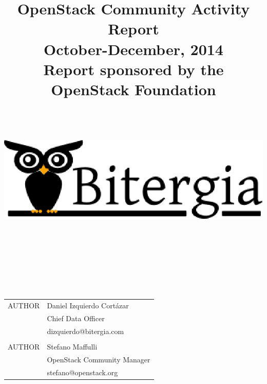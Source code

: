 \documentclass[a4wide,11pt]{report}
\begin{document}
\title{OpenStack Community Activity Report\\
      October-December, 2014 \\
      Report sponsored by the OpenStack Foundation\\
        ~~\\~~\\  \includegraphics[scale=.35]{logo.eps}       \\}




\maketitle


\newpage
~~\\~\\~\\~\\
\begin{tabular}{p{5cm}p{10cm}}
AUTHOR & Daniel Izquierdo Cort\'azar \\
       & Chief Data Officer  \\
       & dizquierdo@bitergia.com \\
       &  \\
AUTHOR  & Stefano Maffulli \\
        & OpenStack Community Manager \\
        & stefano@openstack.org \\
\end{tabular}

~~\\~~\\


~~\\
~~\\
\end{document}

